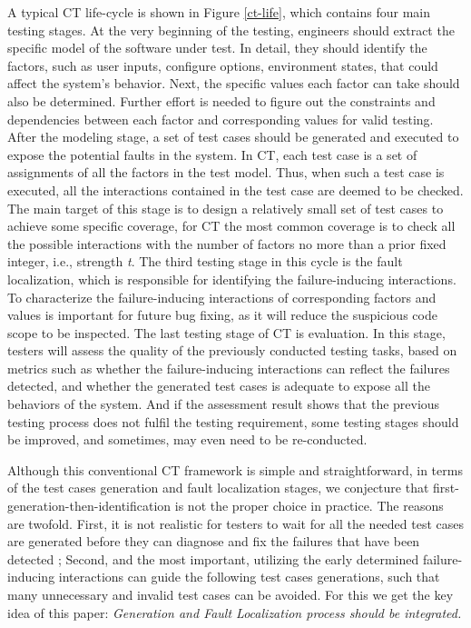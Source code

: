 \documentclass{sig-alternate}
\begin{document}
A typical CT life-cycle is shown in Figure \ref{ct-life}, which contains four main testing stages. At the very beginning of the testing, engineers should extract the specific model of the software under test. In detail, they should identify the factors, such as user inputs, configure options, environment states, that could affect the system's behavior. Next, the specific values each factor can take should also be determined. Further effort is needed to figure out the constraints and dependencies between each factor and corresponding values for valid testing. After the modeling stage, a set of test cases should be generated and executed to expose the potential faults in the system. In CT, each test case is a set of assignments of all the factors in the test model. Thus, when such a test case is executed, all the interactions contained in the test case are deemed to be checked. The main target of this stage is to design a relatively small set of test cases to achieve some specific coverage, for CT the most common coverage is to check all the possible interactions with the number of factors no more than a prior fixed integer, i.e., strength \emph{t}. The third testing stage in this cycle is the fault localization, which is responsible for identifying the failure-inducing interactions. To characterize the failure-inducing interactions of corresponding factors and values is important for future bug fixing, as it will reduce the suspicious code scope to be inspected. The last testing stage of CT is evaluation. In this stage, testers will assess the quality of the previously conducted testing tasks, based on metrics such as whether the failure-inducing interactions can reflect the failures detected, and whether the generated test cases is adequate to expose all the behaviors of the system. And if the assessment result shows that the previous testing process does not fulfil the testing requirement, some testing stages should be improved, and sometimes, may even need to be re-conducted.

Although this conventional CT framework is simple and straightforward, in terms of the test cases generation and fault localization stages, we conjecture that first-generation-then-identification is not the proper choice in practice. The reasons are twofold. First, it is not realistic for testers to wait for all the needed test cases are generated before they can diagnose and fix the failures that have been detected \cite{yoo2013fault}; Second, and the most important, utilizing the early determined failure-inducing interactions can guide the following test cases generations, such that many unnecessary and invalid test cases can be avoided. For this we get the key idea of this paper: \emph{Generation and Fault Localization process should be integrated.}
\end{document}
